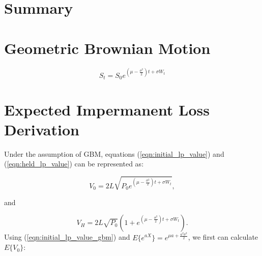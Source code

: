 \documentclass[journal,twocolumn,12pt]{ieeesyscoin}
\begin{document}
\lipsum[1]


\section{Summary}
\label{section:summary}

\lipsum[1]

\appendices

\section{Geometric Brownian Motion}
\label{sec:gbm}

\begin{equation}\label{eqn:gbm}
  S_{t} = S_{0} e^{(\mu - \frac{\sigma^2}{2})t  + \sigma W_{t} }
\end{equation}

\lipsum[1]

\section{Expected Impermanent Loss Derivation}
\label{sec:exp_imp_loss_derv}

Under the assumption of GBM, equations (\ref{eqn:initial_lp_value}) and (\ref{eqn:held_lp_value}) can be represented as:

\begin{equation}\label{eqn:initial_lp_value_gbm}
V_{0} = 2L\sqrt{P_{0} e^{(\mu - \frac{\sigma^2}{2})t + \sigma W_{t} } },
\end{equation}

and 

\begin{equation}\label{eqn:held_lp_value_gbm}
V_{H} = 2L\sqrt{P_{0}} ( 1 + e^{(\mu - \frac{\sigma^2}{2})t + \sigma W_{t} } ).
\end{equation}
Using (\ref{eqn:initial_lp_value_gbm}) and $E\{e^{aX}\} = e^{\mu a + \frac{a^2 \sigma^2}{2}}$, we first can calculate $E\{V_{0}\}$:
\end{document}

